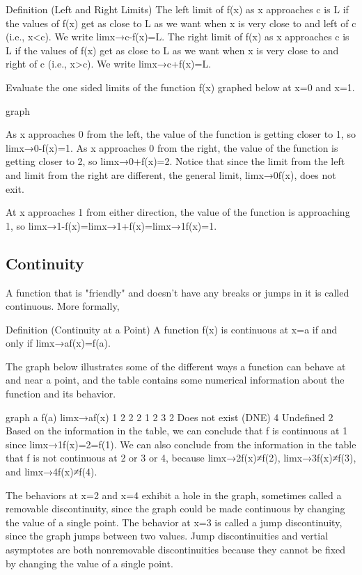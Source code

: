 Definition (Left and Right Limits)
The left limit of f(x) as x approaches c is L if the values of f(x) get as close to L as we want when x is very close to and left of c (i.e., x<c). We write
limx→c-f(x)=L.
The right limit of f(x) as x approaches c is L if the values of f(x) get as close to L as we want when x is very close to and right of c (i.e., x>c). We write
limx→c+f(x)=L.
\begin{example}
Evaluate the one sided limits of the function f(x) graphed below at x=0 and x=1.

graph
\begin{solution} As x approaches 0 from the left, the value of the function is getting closer to 1, so limx→0-f(x)=1.
As x approaches 0 from the right, the value of the function is getting closer to 2, so limx→0+f(x)=2.
Notice that since the limit from the left and limit from the right are different, the general limit, limx→0f(x), does not exit.

At x approaches 1 from either direction, the value of the function is approaching 1, so
limx→1-f(x)=limx→1+f(x)=limx→1f(x)=1.
\end{solution}\end{example}

\subsection{Continuity}
\label{ssec:continuity}
A function that is "friendly" and doesn’t have any breaks or jumps in it is called continuous. More formally,

Definition (Continuity at a Point)
A function f(x) is continuous at x=a if and only if limx→af(x)=f(a).

The graph below illustrates some of the different ways a function can behave at and near a point, and the table contains some numerical information about the function and its behavior.

graph a	f(a)	limx→af(x)	1	2	2	2	1	2	3	2	Does not exist (DNE)	4	Undefined	2
Based on the information in the table, we can conclude that f is continuous at 1 since limx→1f(x)=2=f(1). We can also conclude from the information in the table that f is not continuous at 2 or 3 or 4, because limx→2f(x)≠f(2), limx→3f(x)≠f(3), and limx→4f(x)≠f(4).

The behaviors at x=2 and x=4 exhibit a hole in the graph, sometimes called a removable discontinuity, since the graph could be made continuous by changing the value of a single point. The behavior at x=3 is called a jump discontinuity, since the graph jumps between two values. Jump discontinuities and vertial asymptotes are both nonremovable discontinuities because they cannot be fixed by changing the value of a single point.

